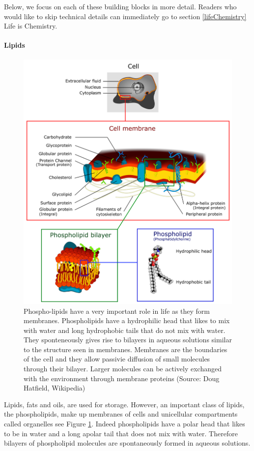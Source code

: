 \documentclass[
  11pt,
]{book}
\begin{document}
Below, we focus on each of these building blocks in more detail. Readers who would like to skip technical details can immediately go to section \ref{lifeChemistry} Life is Chemistry.

\hypertarget{lipids}{%
\paragraph{Lipids}\label{lipids}}

\begin{figure}

{\centering \includegraphics[width=0.8\linewidth]{./figs/Cell_membrane_detailed_diagram_4} 

}

\caption{Phospho-lipids have a very important role in life as they form membranes. Phospholipids have a hydrophilic head that likes to mix with water and long hydrophobic tails that do not mix with water. They sponteneously gives rise to bilayers in aqueous solutions similar to the structure seen in membranes. Membranes are the boundaries of the cell and they allow passivie diffusion of small molecules through their bilayer. Larger molecules can be actively exchanged with the environment through membrane proteins (Source: Doug Hatfield, Wikipedia)}\label{fig:lipids}
\end{figure}

Lipids, fats and oils, are used for storage. However, an important class of lipids, the phospholipids, make up membranes of cells and unicellular compartments called organelles see Figure \ref{fig:lipids}. Indeed phospholipids have a polar head that likes to be in water and a long apolar tail that does not mix with water. Therefore bilayers of phospholipid molecules are spontaneously formed in aqueous solutions.
\end{document}
